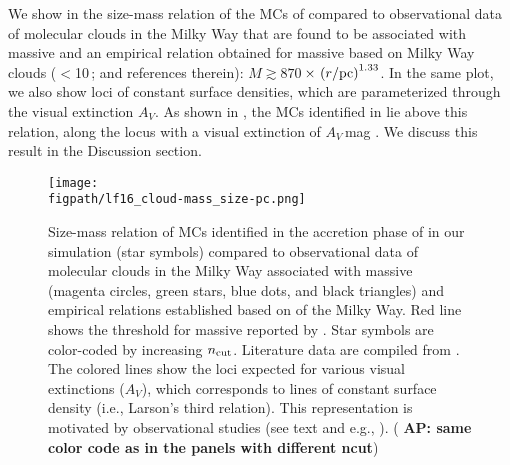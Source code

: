 \IfFileExists{emulateapjlegacy.cls}{\documentclass[iop]{emulateapjlegacy}}{\documentclass[iop]{emulateapj}}
\newcommand{\AP}[1]{({\bf \color{apcolor} AP: #1})}
\def\figpath{./Fig}
\begin{document}
We show in  the size-mass relation of the MCs of \flower compared to observational data of molecular clouds in the Milky Way that are found to be associated with massive \SF \citep{Beuther02a, Mueller02a, Hill05a, Motte07a} and an empirical relation obtained for massive \SF based on Milky Way clouds ($<$10\,\Msun; \citealt{Kauffmann10b, Kauffmann10c} and references therein): $M \gtrsim 870$\,\Msun$\times\,\left(r/{\rm pc}\right)^{1.33}$.
%
In the same plot, we also show loci of constant surface densities, which are parameterized through the visual extinction $A_V$. As shown in , the MCs identified in \flower lie above this relation, along the locus with a visual extinction of $A_V$\,mag \citep{Lombardi10a}. We discuss this result in the Discussion section.

\begin{figure*}[htbp]
\centering
\texttt{[image: \\figpath/lf16\_cloud-mass\_size-pc.png]}
\caption{
Size-mass relation of MCs identified in the accretion phase of \flower in our simulation (star symbols) compared to observational data of molecular clouds in the Milky Way associated with massive \SF (magenta circles, green stars, blue dots, and black triangles) and empirical relations established based on \obs of the Milky Way. Red line shows the threshold for massive \SF reported by \citet{Kauffmann10b}. Star symbols are color-coded by increasing $n_{\rm cut}$. Literature data are compiled from \citet{Beuther02a, Mueller02a, Hill05a, Motte07a}. The colored lines show the loci expected for various visual extinctions ($A_V$), which corresponds to lines of constant surface density (i.e., Larson's third relation). This representation is motivated by observational studies (see text and e.g., \citealt{Lombardi10a}).
\AP{same color code as in the panels with different ncut}
\label{fig:MR}}
\end{figure*}
\end{document}
